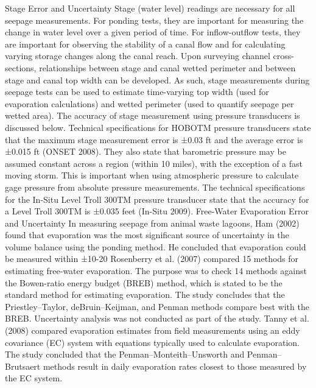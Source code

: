 \begin{linenumbers}
Stage Error and Uncertainty
Stage (water level) readings are necessary for all seepage measurements.  For ponding tests, they are important for measuring the change in water level over a given period of time.  For inflow-outflow tests, they are important for observing the stability of a canal flow and for calculating varying storage changes along the canal reach.  Upon surveying channel cross-sections, relationships between stage and canal wetted perimeter and between stage and canal top width can be developed.  As such, stage measurements during seepage tests can be used to estimate time-varying top width (used for evaporation calculations) and wetted perimeter (used to quantify seepage per wetted area).  The accuracy of stage measurement using pressure transducers is discussed below.
Technical specifications for HOBOTM pressure transducers state that the maximum stage measurement error is ±0.03 ft and the average error is ±0.015 ft (ONSET 2008).  They also state that barometric pressure may be assumed constant across a region (within 10 miles), with the exception of a fast moving storm.  This is important when using atmospheric pressure to calculate gage pressure from absolute pressure measurements.
The technical specifications for the In-Situ Level Troll 300TM pressure transducer state that the accuracy for a Level Troll 300TM is ±0.035 feet (In-Situ 2009).
Free-Water Evaporation Error and Uncertainty
In measuring seepage from animal waste lagoons, Ham (2002) found that evaporation was the most significant source of uncertainty in the volume balance using the ponding method.  He concluded that evaporation could be measured within ±10-20%
Rosenberry et al. (2007) compared 15 methods for estimating free-water evaporation.  The purpose was to check 14 methods against the Bowen-ratio energy budget (BREB) method, which is stated to be the standard method for estimating evaporation.  The study concludes that the Priestley–Taylor, deBruin–Keijman, and Penman methods compare best with the BREB.  Uncertainty analysis was not conducted as part of the study.
Tanny et al. (2008) compared evaporation estimates from field measurements using an eddy covariance (EC) system with equations typically used to calculate evaporation.  The study concluded that the Penman–Monteith–Unsworth and Penman–Brutsaert methods result in daily evaporation rates closest to those measured by the EC system.

\end{linenumbers}

